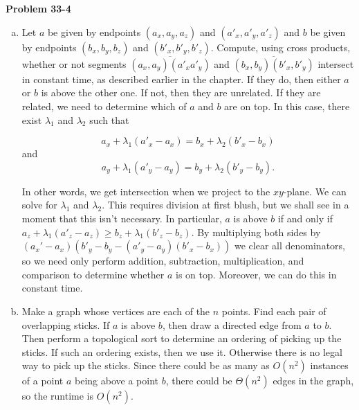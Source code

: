 \documentclass{article}
\begin{document}
\noindent\textbf{Problem 33-4}\\

\begin{enumerate}[a.]
\item Let $a$ be given by endpoints $(a_x, a_y, a_z)$ and $(a'_x, a'_y, a'_z)$ and $b$ be given by endpoints $(b_x,b_y,b_z)$ and $(b'_x,b'_y,b'_z)$.   Compute, using cross products, whether or not segments $\overline{(a_x,a_y)(a'_xa'_y)}$ and $\overline{(b_x,b_y)(b'_x,b'_y)}$ intersect in constant time, as described earlier in the chapter.  If they do, then either $a$ or $b$ is above the other one.  If not, then they are unrelated.  If they are related, we need to determine which of $a$ and $b$ are on top.  In this case, there exist $\lambda_1$ and $\lambda_2$ such that 

\[ a_x + \lambda_1(a'_x - a_x) = b_x + \lambda_2(b'_x - b_x)\]
and
\[ a_y + \lambda_1(a'_y-a_y) = b_y + \lambda_2(b'_y-b_y).\]

In other words, we get intersection when we project to the $xy$-plane.  We can solve for $\lambda_1$ and $\lambda_2$.  This requires division at first blush, but we shall see in a moment that this isn't necessary.  In particular, $a$ is above $b$ if and only if $a_z + \lambda_1(a'_z - a_z) \geq b_z + \lambda_1(b'_z-b_z)$.  By multiplying both sides by $(a_x'-a_x)(b'_y-b_y - (a'_y-a_y)(b'_x-b_x))$ we clear all denominators, so we need only perform addition, subtraction, multiplication, and comparison to determine whether $a$ is on top.  Moreover, we can do this in constant time. 

\item Make a graph whose vertices are each of the $n$ points.  Find each pair of overlapping sticks.  If $a$ is above $b$, then draw a directed edge from $a$ to $b$.   Then perform a topological sort to determine an ordering of picking up the sticks.  If such an ordering exists, then we use it.  Otherwise there is no legal way to pick up the sticks.  Since there could be as many as $O(n^2)$ instances of a point $a$ being above a point $b$, there could be $\Theta(n^2)$ edges in the graph, so the runtime is $O(n^2)$. 
\end{enumerate}
\end{document}
